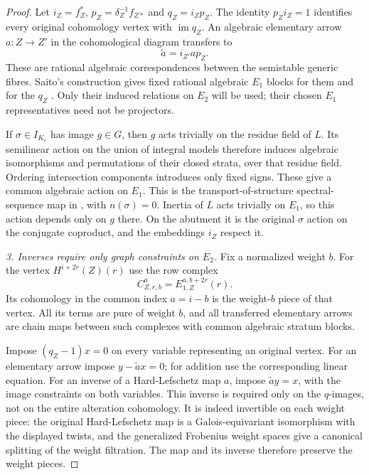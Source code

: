 \begin{proof}
Let $i_Z=f_Z^*$, $p_Z=\delta_Z^{-1}f_{Z*}$ and
$q_Z=i_Zp_Z$. The identity $p_Zi_Z=1$ identifies every original
cohomology vertex with $\operatorname{im}q_Z$.
An algebraic elementary arrow $a:Z\to Z'$ in the cohomological
diagram transfers to
\[
                    \widetilde a=i_{Z'}a p_Z.
\]
These are rational algebraic correspondences between the
semistable generic fibres. Saito's construction gives fixed
rational algebraic $E_1$ blocks for them and for the $q_Z$
\citep[Lemmas~2.4.1--2.4.2, Corollary~2.4.3 and
Proposition~2.4.4, author pp.~33--36]{c_saito2003weights}.
Only their induced relations on $E_2$ will be used;
their chosen $E_1$ representatives need not be projectors.

If $\sigma\in I_{K_v}$ has image $g\in G$, then $g$ acts
trivially on the residue field of $L$. Its semilinear action
on the union of integral models therefore induces algebraic
isomorphisms and permutations of their closed strata, over
that residue field. Ordering intersection components introduces
only fixed signs. These give a common algebraic action on $E_1$.
This is the transport-of-structure spectral-sequence map in
\citet[Lemma~3.2, complete proof on author pp.~36--38;
Lemma~3.3 and proof, pp.~38--39]{c_saito2003weights},
with $n(\sigma)=0$. Inertia of $L$ acts trivially on $E_1$,
so this action depends only on $g$ there.
On the abutment it is the original $\sigma$ action on the
conjugate coproduct, and the embeddings $i_Z$ respect it.

\emph{3. Inverses require only graph constraints on $E_2$.}
Fix a normalized weight $b$.
For the vertex $H^{i+2r}(Z)(r)$ use the row complex
\[
 C_{Z,r,b}^a=E_{1,Z}^{a,b+2r}(r).
\]
Its cohomology in the common index $a=i-b$ is the weight-$b$
piece of that vertex. All its terms are pure of weight $b$,
and all transferred elementary arrows are chain maps between
such complexes with common algebraic stratum blocks.

Impose $(q_Z-1)x=0$ on every variable representing an original
vertex. For an elementary arrow impose $y-\widetilde a x=0$;
for addition use the corresponding linear equation. For an inverse
of a Hard-Lefschetz map $a$, impose $\widetilde a y=x$, with
the image constraints on both variables. This inverse is required
only on the $q$-images, not on the entire alteration cohomology.
It is indeed invertible on each weight piece: the original
Hard-Lefschetz map is a Galois-equivariant isomorphism with the
displayed twists, and the generalized Frobenius weight spaces
give a canonical splitting of the weight filtration.
The map and its inverse therefore preserve the weight pieces.


\end{proof}
